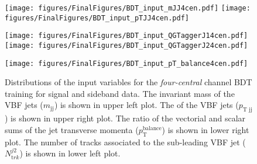 \documentclass[PAPER, american,coverpage,texlive=2016, english]{\ATLASLATEXPATH atlasdoc}
\providecommand{\DIFaddbeginFL}{} %
\providecommand{\DIFaddendFL}{} %
\providecommand{\DIFdelbeginFL}{} %
\providecommand{\DIFdelendFL}{} %
\begin{document}
\begin{figure}[htbp]
  \centering

  \DIFdelbeginFL %
\DIFdelendFL \DIFaddbeginFL \texttt{[image: figures/FinalFigures/BDT\_input\_mJJ4cen.pdf]}
  \texttt{[image: figures/FinalFigures/BDT\_input\_pTJJ4cen.pdf]}

\DIFaddendFL 

  \DIFdelbeginFL %
\DIFdelendFL \DIFaddbeginFL \texttt{[image: figures/FinalFigures/BDT\_input\_QGTaggerJ14cen.pdf]}
  \texttt{[image: figures/FinalFigures/BDT\_input\_QGTaggerJ24cen.pdf]}

\DIFaddendFL 

  \DIFdelbeginFL %
\DIFdelendFL \DIFaddbeginFL \texttt{[image: figures/FinalFigures/BDT\_input\_pT\_balance4cen.pdf]}

\DIFaddendFL 

  \caption{Distributions of the input variables for the \textit{four-central} channel BDT training for signal and sideband data. The invariant mass of the VBF jets ($m_{\text{jj}}$) is shown in upper left plot. The \pT{} of the VBF jets ($p_{\text{T~jj}}$) is shown in upper right plot.   The ratio of the vectorial and scalar sums of the jet transverse momenta ($p^{\text{balance}}_{\text{T}}$) is shown in lower right plot.  The number of tracks associated to the sub-leading VBF jet ($N_{\mathrm trk}^{j2}$) is shown in lower left plot.}
  \label{fig:bdtvar4cen2}
\end{figure}
\end{document}

